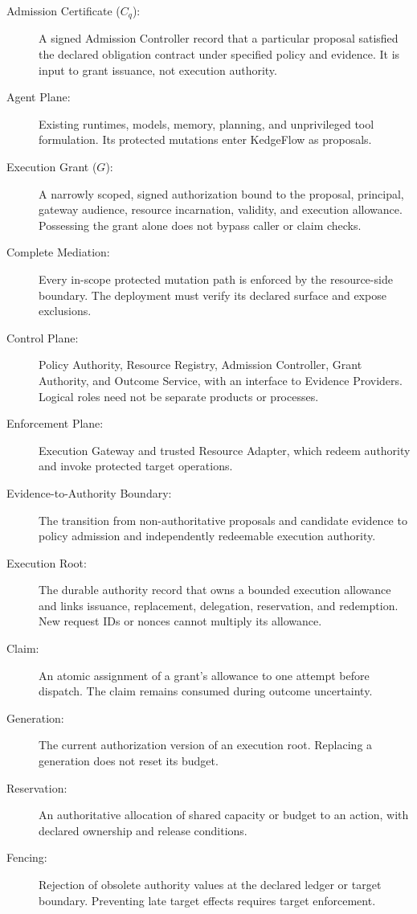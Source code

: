\begin{description}
\item[Admission Certificate ($C_q$):] A signed Admission Controller record that a particular proposal satisfied the declared obligation contract under specified policy and evidence. It is input to grant issuance, not execution authority.
\item[Agent Plane:] Existing runtimes, models, memory, planning, and unprivileged tool formulation. Its protected mutations enter KedgeFlow as proposals.
\item[Execution Grant ($G$):] A narrowly scoped, signed authorization bound to the proposal, principal, gateway audience, resource incarnation, validity, and execution allowance. Possessing the grant alone does not bypass caller or claim checks.
\item[Complete Mediation:] Every in-scope protected mutation path is enforced by the resource-side boundary. The deployment must verify its declared surface and expose exclusions.
\item[Control Plane:] Policy Authority, Resource Registry, Admission Controller, Grant Authority, and Outcome Service, with an interface to Evidence Providers. Logical roles need not be separate products or processes.
\item[Enforcement Plane:] Execution Gateway and trusted Resource Adapter, which redeem authority and invoke protected target operations.
\item[Evidence-to-Authority Boundary:] The transition from non-authoritative proposals and candidate evidence to policy admission and independently redeemable execution authority.
\item[Execution Root:] The durable authority record that owns a bounded execution allowance and links issuance, replacement, delegation, reservation, and redemption. New request IDs or nonces cannot multiply its allowance.
\item[Claim:] An atomic assignment of a grant's allowance to one attempt before dispatch. The claim remains consumed during outcome uncertainty.
\item[Generation:] The current authorization version of an execution root. Replacing a generation does not reset its budget.
\item[Reservation:] An authoritative allocation of shared capacity or budget to an action, with declared ownership and release conditions.
\item[Fencing:] Rejection of obsolete authority values at the declared ledger or target boundary. Preventing late target effects requires target enforcement.

\end{description}
